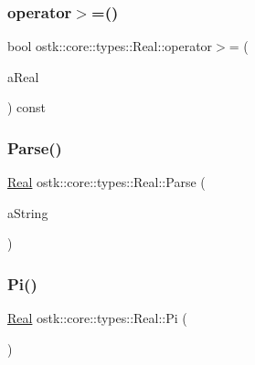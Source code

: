 \mbox{\label{classostk_1_1core_1_1types_1_1_real_a27a569f5d4a0dd5a50b826432cfa73cc}} 
\subsubsection{\texorpdfstring{operator$>$=()}{operator>=()}\hspace{0.1cm}{\footnotesize\ttfamily [2/2]}}
{\footnotesize\ttfamily bool ostk\+::core\+::types\+::\+Real\+::operator$>$= (\begin{DoxyParamCaption}\item[{const \hyperlink{classostk_1_1core_1_1types_1_1_real_aa26f796c30b514c98d573f82e3b02296}{Real\+::\+Value\+Type} \&}]{a\+Real }\end{DoxyParamCaption}) const}

\mbox{\label{classostk_1_1core_1_1types_1_1_real_aa4de7cf29f4eb1a34322e71b86535987}} 
\subsubsection{\texorpdfstring{Parse()}{Parse()}}
{\footnotesize\ttfamily \hyperlink{classostk_1_1core_1_1types_1_1_real}{Real} ostk\+::core\+::types\+::\+Real\+::\+Parse (\begin{DoxyParamCaption}\item[{const \hyperlink{classostk_1_1core_1_1types_1_1_string}{types\+::\+String} \&}]{a\+String }\end{DoxyParamCaption})\hspace{0.3cm}{\ttfamily [static]}}

\mbox{\label{classostk_1_1core_1_1types_1_1_real_a0137dac8838c3c17bfa0ad9f64f894a8}} 
\subsubsection{\texorpdfstring{Pi()}{Pi()}}
{\footnotesize\ttfamily \hyperlink{classostk_1_1core_1_1types_1_1_real}{Real} ostk\+::core\+::types\+::\+Real\+::\+Pi (\begin{DoxyParamCaption}{ }\end{DoxyParamCaption})\hspace{0.3cm}{\ttfamily [static]}}

